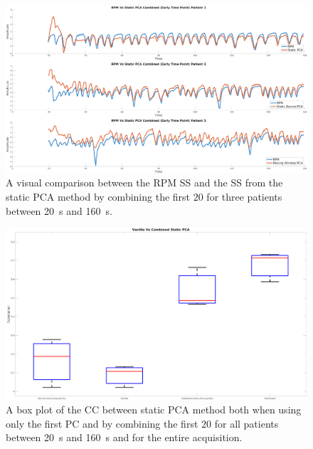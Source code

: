             \begin{figure}
                \centering
                
                \includegraphics[width=1.0\linewidth]{figures/data_driven_surrogate_signal_extraction_results_1_combined_surrogate_signal.png}
                
                \captionsetup{singlelinecheck=false, justification=centering}
                \caption{A visual comparison between the \gls{RPM} \gls{SS} and the \gls{SS} from the static \gls{PCA} method by combining the first $20$  for three patients between \SI{20}{\second} and \SI{160}{\second}.}
                \label{fig:pca_data_driven_surrogate_signal_extraction_methods_for_dynamic_pet_results_combined_surrogate_signal}
            \end{figure}
            
            \begin{figure}
                \centering
                
                \includegraphics[width=1.0\linewidth]{figures/data_driven_surrogate_signal_extraction_results_1_box_plot.png}
                
                \captionsetup{singlelinecheck=false, justification=centering}
                \caption{A box plot of the \gls{CC} between static \gls{PCA} method both when using only the first \gls{PC} and by combining the first $20$  for all patients between \SI{20}{\second} and \SI{160}{\second} and for the entire acquisition.}
                \label{fig:pca_data_driven_surrogate_signal_extraction_methods_for_dynamic_pet_results_box_plot}
            \end{figure}
            
